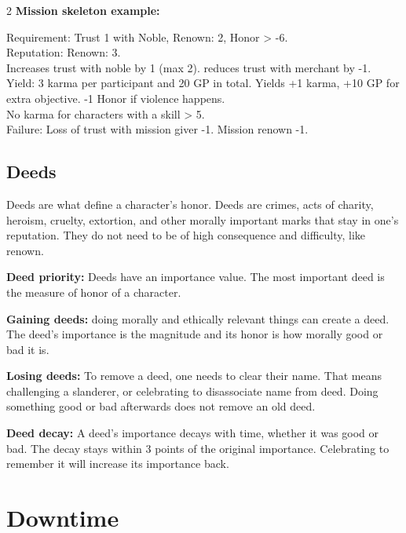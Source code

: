\begin{multicols}{2}
\textbf{Mission skeleton example: }

Requirement: Trust 1 with Noble, Renown: 2, Honor > -6. \\
Reputation: Renown:  3. \\
Increases trust with noble by 1 (max 2). reduces trust with merchant by -1. \\
Yield: 3 karma per participant and 20 GP in total. Yields +1 karma, +10 GP for extra objective. -1 Honor if violence happens.\\
No karma for characters with a skill > 5.\\
Failure: Loss of trust with mission giver -1. Mission renown -1. 

\subsection{Deeds}

Deeds are what define a character's honor. Deeds are crimes, acts of charity, heroism, cruelty, extortion, and other morally important marks that stay in one's reputation. They do not need to be of high consequence and difficulty, like renown. 

\textbf{Deed priority:} Deeds have an importance value. The most important deed is the measure of honor of a character.

\textbf{Gaining deeds:} doing morally and ethically relevant things can create a deed. The deed's importance is the magnitude and its honor is how morally good or bad it is.

\textbf{Losing deeds:} To remove a deed, one needs to clear their name. That means challenging a slanderer, or celebrating to disassociate name from deed. Doing something good or bad afterwards does not remove an old deed.

\textbf{Deed decay:} A deed's importance decays with time, whether it was good or bad. The decay stays within 3 points of the original importance. Celebrating to remember it will increase its importance back.


\section{Downtime}

\newcommand{\downtime}[6]{
\statrule
{\sffamily\bfseries\large Activity: #1} \\
\statlabel{Days:} #2 \\
\statlabel{Cost:} #3 \\
\statlabel{Requirement:} #4 \\
\statlabel{Test} #5 \\
\statlabel{Yield:} #6 \\
}


\end{multicols}

